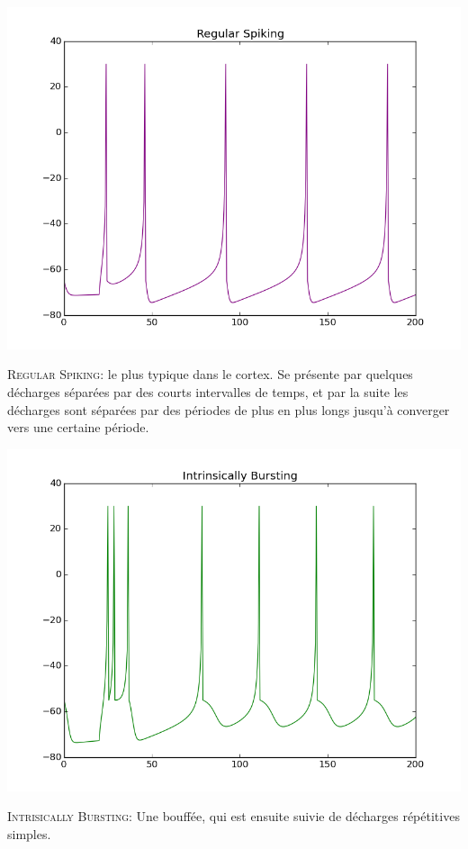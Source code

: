 \documentclass[10pt]{article}
\begin{document}
\begin{center}
\includegraphics[scale=0.5]{figure_1}
\end{center}
\justify
\textsc{Regular Spiking}: le plus typique dans le cortex. Se présente par quelques décharges séparées par des courts intervalles de temps, et par la suite les décharges sont séparées par des périodes de plus en plus longs jusqu'à converger vers une certaine période.

\begin{center}
\includegraphics[scale=0.5]{figure_2}
\end{center}
\justify
\textsc{Intrisically Bursting:} Une bouffée, qui est ensuite suivie de décharges répétitives simples.
\end{document}
